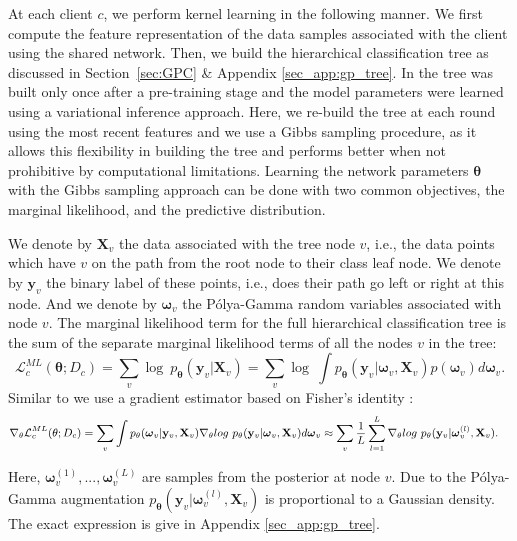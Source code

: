 \documentclass{article}
\def\Secref#1{Section~\ref{#1}}
\newcommand{\bld}[1]{\boldsymbol{#1}}
\def\rvy{{\mathbf{y}}}
\def\rmX{{\mathbf{X}}}
\newcommand{\pg}{P\'olya-Gamma }
\newcommand{\rvomega}{\bld{\mathbf{\omega}}}
\newcommand{\NNP}{\mathbf{\theta}}
\begin{document}
At each client $c$, we perform kernel learning in the following manner. We first compute the feature representation of the data samples associated with the client using the shared network. Then, we build the hierarchical classification tree as discussed in \Secref{sec:GPC} \& Appendix \ref{sec_app:gp_tree}. In \cite{achituve2021gp_icml} the tree was built only once after a pre-training stage and the model parameters were learned using a variational inference approach. Here, we re-build the tree at each round using the most recent features and we use a Gibbs sampling procedure, as it allows this flexibility in building the tree and performs better when not prohibitive by computational limitations.
Learning the network parameters $\NNP$ with the Gibbs sampling approach can be done with two common objectives, the marginal likelihood, and the predictive distribution. 

We denote by $\rmX_v$ the data associated with the tree node $v$, i.e., the data points which have $v$ on the path from the root node to their class leaf node. We denote by $\rvy_v$ the binary label of these points, i.e., does their path go left or right at this node. And we denote by $\rvomega_v$ the \pg random variables associated with node $v$. The marginal likelihood term for the full hierarchical classification tree is the  sum of the separate marginal likelihood terms of all the nodes $v$ in the tree:
\begin{equation}\label{eq:tree_objective_ml}
        \mathcal{L}^{ML}_c (\NNP ; D_c) = \sum_{v} \log~p_{\NNP}(\rvy_{v} | \rmX_{v}) = \sum_{v} \log~\int p_{\NNP}(\rvy_{v} | \rvomega_{v}, \rmX_{v}) p(\rvomega_{v}) d\rvomega_{v}.
\end{equation}
Similar to \cite{snell2020bayesian} we use a gradient estimator based on Fisher's identity \cite{douc2014nonlinear}:
\begin{equation}\label{eq:tree_objective_ml_gradients}
    \small
    \begin{aligned}
        \nabla_{\NNP}\mathcal{L}^{ML}_c (\NNP ; D_c) &= \sum_{v } \int p_{\NNP}(\rvomega_{v} | \rvy_{v}, \rmX_{v})\nabla_{\NNP}log~p_{\NNP}(\rvy_{v} | \rvomega_{v}, \rmX_{v})d\rvomega_{v}
        \approx \sum_{v } \frac{1}{L} \sum_{l=1}^{L} \nabla_{\NNP}log~p_{\NNP}(\rvy_{v} | \rvomega_{v}^{(l)}, \rmX_{v}). 
\end{aligned}
\end{equation}
\iffalse
\begin{equation}\label{eq:tree_objective_ml_gradients}
        \nabla_{\NNP}\mathcal{L}^{ML}_c (\NNP ; D_c) &\approx \sum_{v } \frac{1}{L} \sum_{l=1}^{L} \nabla_{\NNP}log~p_{\NNP}(\rvy_{v} | \rvomega_{v}^{(l)}, \rmX_{v}).
\end{equation}
\fi
Here, $\rvomega_{v}^{(1)}, ..., \rvomega_{v}^{(L)}$ are samples from the posterior at node ${v}$. Due to the \pg augmentation $p_{\NNP}(\rvy_{v} | \rvomega_{v}^{(l)}, \rmX_{v})$ is proportional to a Gaussian density. The exact expression is give in Appendix \ref{sec_app:gp_tree}.
\end{document}
